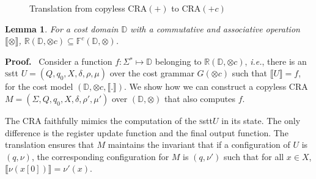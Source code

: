 \documentclass[11pt]{article}
\newtheorem{lemma}[theorem]{Lemma}
\def\Proof{{\bf Proof.}}
\newcommand{\st}{\ensuremath{^*}}
\newcommand{\domain}{\ensuremath{\mathbb{D}}}
\newcommand{\CG}{G}
\newcommand{\CCF}{{\mathbb F}^c}
\newcommand{\reg}[1]{{\mathbb R}(#1)}
\newcommand{\SSTT}{{\sc\textsc sstt}\xspace}
\newcommand{\stt}{\ensuremath{U}}
\newcommand{\inputalph}{\ensuremath{\Sigma}}
\newcommand{\valuation}{\ensuremath{\nu}}
\newcommand{\interp}[1]{\ensuremath{\llbracket #1\rrbracket}}
\newcommand{\EDWA}{{CRA}\xspace}
\newcommand{\edwa}{\ensuremath{M}}
\newcommand{\edwastates}{\ensuremath{Q}}
\newcommand{\edwastate}{\ensuremath{q}}
\newcommand{\edwainitst}{\ensuremath{\edwastate_0}}
\newcommand{\edwavariables}{\ensuremath{X}}
\newcommand{\edwatrans}{\ensuremath{\delta}}
\newcommand{\edwavarup}{\ensuremath{\rho}}
\newcommand{\edwafinal}{\ensuremath{\mu}}
\newcommand{\setof}[1]{\{#1\}}
\newcommand{\ie}{{\em i.e.}\xspace}
\def\myplus{\otimes}
\begin{document}
\begin{figure}[t]
\caption{Translation from copyless \EDWA$(+)$ to \EDWA$(+c)$\label{subsetc}}
\end{figure}

\begin{lemma}
\label{ssttopcedwa}
For a cost domain $\domain$ with a commutative and associative operation
$\interp{\myplus}$, $\reg{\domain,\myplus c}\subseteq
\CCF(\domain,\myplus)$.
\end{lemma}

\Proof~ Consider a function $f:\Sigma\st\mapsto\domain$ belonging to
$\reg{\domain,\myplus c}$, \ie, there is an \SSTT
$\stt=(Q,q_0,X,\delta,\rho,\mu)$ over the cost grammar $\CG(\myplus c)$
such that $\interp{\stt} = f$, for the cost model
$(\domain,\myplus c,\interp{.})$.  We show how we can construct a
copyless \EDWA~
$\edwa=(\inputalph,\edwastates,\edwainitst,\edwavariables,\edwatrans,\edwavarup',\edwafinal')$
over $(\domain,\myplus)$ that also computes $f$.

The \EDWA faithfully mimics the computation of the \SSTT $\stt$ in its
state. The only difference is the register update function and the
final output function.  The translation ensures that $\edwa$ maintains
the invariant that if a configuration of $\stt$ is
$(\edwastate,\valuation)$, the corresponding configuration for $M$ is
$(\edwastate,\valuation')$ such that for all $x\in X$,
$\interp{\valuation(x[0])} = \valuation'(x)$.
\end{document}
